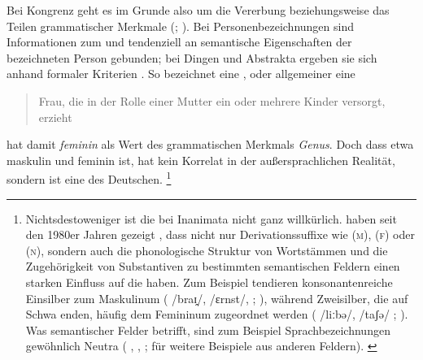 Bei Kongrenz geht es im Grunde also um die Vererbung beziehungsweise das Teilen
grammatischer Merkmale (;
\cite{corbett2012}). Bei Personenbezeichnungen sind Informationen zum
 und  tendenziell an semantische
Eigenschaften der bezeichneten Person
gebunden; bei Dingen und Abstrakta ergeben sie sich anhand formaler
Kriterien \autocites[vgl.][2--4,
125--132]{corbett2006}{koepckezubin2017}. So bezeichnet
 eine ,
oder allgemeiner eine \blockcquote[s.\,v.~]{duden-online}{Frau, die
in der Rolle einer Mutter ein oder mehrere Kinder versorgt, erzieht}.
 hat damit \emph{feminin} als Wert des grammatischen
Merkmals \emph{Genus}. Doch dass etwa  maskulin und 
feminin ist, hat kein Korrelat in der außersprachlichen Realität, sondern ist
eine  des Deutschen.%
%
	\footnote{Nichtsdestoweniger ist die  bei
		Inanimata nicht ganz willkürlich.
		\citeauthor{koepckezubin2017} haben seit den 1980er Jahren gezeigt
		\autocites[z.\,B.][]%
			{koepcke1982}%
			{koepckezubin1996}%
			{koepckezubin2009}%
			{koepckezubin2017},
		dass nicht nur Derivationssuffixe wie
			 (\textsc{m}),
			 (\textsc{f}) oder
			 (\textsc{n}),
		sondern auch die phonologische Struktur von Wortstämmen und die
		Zugehörigkeit von Substantiven zu bestimmten
		semantischen Feldern einen starken Einfluss auf die
		 haben. Zum Beispiel tendieren konsonantenreiche
		Einsilber zum Maskulinum (%
			 /braɪ̯/,
			/ɛrnst/,
			;
		\cite[vgl.][475--479]{koepckezubin1996}), während Zweisilber, die auf
		Schwa enden, häufig dem Femininum zugeordnet werden (%
			 /liːbə/,
			/taʃə/%
			;
		\cite[vgl.][207--209]{koepckezubin2017}). Was semantischer Felder
		betrifft, sind zum Beispiel Sprachbezeichnungen gewöhnlich Neutra (%
			,
			,
			;
		\cites[siehe]%
			[480]{koepckezubin1996}%
			[137--139]{koepckezubin2009}%
			[210--214]{koepckezubin2017}
		für weitere Beispiele aus anderen Feldern).%
		\label{fn:koepckezubin}
	}

